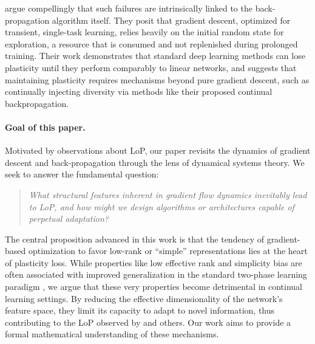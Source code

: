 \documentclass{article}
\newcommand{\GIU}[1]{\todo[color=purple!30,size=\tiny]{GIU: #1}}
\numberwithin{figure}{section}
\begin{document}
\citet{dohare2024loss} argue compellingly that such failures are intrinsically linked to the back-propagation algorithm itself. They posit that gradient descent, optimized for transient, single-task learning, relies heavily on the initial random state for exploration, a resource that is consumed and not replenished during prolonged training. Their work demonstrates that standard deep learning methods can lose plasticity until they perform comparably to linear networks, and suggests that maintaining plasticity requires mechanisms beyond pure gradient descent, such as continually injecting diversity via methods like their proposed continual backpropagation.

\paragraph{Goal of this paper.}
Motivated by observations about LoP, our paper revisits the dynamics of gradient descent and back-propagation through the lens of dynamical systems theory. We seek to answer the fundamental question:
\begin{quote}
\emph{What structural features inherent in gradient flow dynamics inevitably lead to LoP, and how might we design algorithms or architectures capable of perpetual adaptation?}
\end{quote}
The central proposition advanced in this work is that the tendency of gradient-based optimization to favor low-rank or ``simple'' representations lies at the heart of plasticity loss. While properties like low effective rank and simplicity bias are often associated with improved generalization in the standard two-phase learning paradigm \citep{huh2022lowrank, papyan2020prevalence, zhang2017understanding}, we argue that these very properties become detrimental in continual learning settings. By reducing the effective dimensionality of the network's feature space, they limit its capacity to adapt to novel information, thus contributing to the LoP observed by \citep{dohare2024loss} and others. Our work aims to provide a formal mathematical understanding of these mechanisms.
\end{document}
